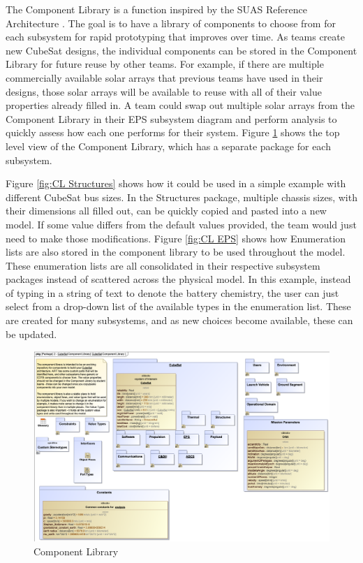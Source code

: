 The Component Library is a function inspired by the SUAS Reference Architecture \citep{Jacques2019}. The goal is to have a library of components to choose from for each subsystem for rapid prototyping that improves over time. As teams create new CubeSat designs, the individual components can be stored in the Component Library for future reuse by other teams. For example, if there are multiple commercially available solar arrays that previous teams have used in their designs, those solar arrays will be available to reuse with all of their value properties already filled in. A team could swap out multiple solar arrays from the Component Library in their EPS subsystem diagram and perform analysis to quickly assess how each one performs for their system. Figure \ref{fig:Component Library} shows the top level view of the Component Library, which has a separate package for each subsystem. 

Figure \ref{fig:CL Structures} shows how it could be used in a simple example with different CubeSat bus sizes. In the Structures package, multiple chassis sizes, with their dimensions all filled out, can be quickly copied and pasted into a new model. If some value differs from the default values provided, the team would just need to make those modifications. Figure \ref{fig:CL EPS} shows how Enumeration lists are also stored in the component library to be used throughout the model. These enumeration lists are all consolidated in their respective subsystem packages instead of scattered across the physical model. In this example, instead of typing in a string of text to denote the battery chemistry, the user can just select from a drop-down list of the available types in the enumeration list. These are created for many subsystems, and as new choices become available, these can be updated. 

\begin{figure}[H]
    \centering
    \includegraphics[width=\textwidth]{Thesis/Analysis_and_Results/Analysis and Results Figures/Component Library.png}
    \caption{Component Library}
    \label{fig:Component Library}
\end{figure}

